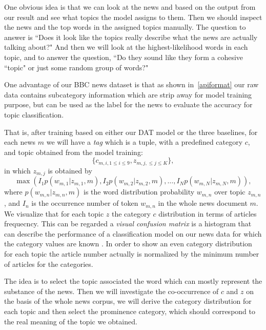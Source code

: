 One obvious idea is that we can look at the news and based on the output from our result and see what topics the model assigns to them. Then we should inspect the news and the top words in the assigned topics manually. The question to answer is ``Does it look like the topics really describe what the news are actually talking about?" And then we will look at the highest-likelihood words in each topic, and to answer the question, ``Do they sound like they form a cohesive ``topic" or just some random group of words?"

One advantage of our BBC news dataset is that as shown in~\ref{apiformat} our raw data contains subcategory information which are strip away for model training purpose, but can be used as the label for the news to evaluate the accuracy for topic classification. 

That is, after training based on either our DAT model or the three baselines, for each news $m$ we will have a \textit{tag} which is a tuple, with a predefined category $c$, and topic obtained from the model training:
\begin{equation}
\{c_{m, i, 1 \leq i \leq 9}, z_{m, j, \leq j \leq K}\}, 
\end{equation}
in which $z_{m,j}$ is obtained by 
\begin{equation}
\max ({I_1{p(w_{m,1}|z_{m,1},m)}},{I_2{p(w_{m,2}|z_{m,2},m)}}, \ldots , {I_N{p(w_{m,N}|z_{m,N},m)}}),
\end{equation}
where ${{p(w_{m,n}|z_{m,n},m)}}$ is the word distribution probability $w_{m,n}$ over topic $z_{m,n}$, and ${I_n}$ is the occurrence number of token $w_{m,n}$ in the whole news document $m$. We visualize that for each topic $z$ the category $c$ distribution in terms of articles frequecncy. This can be regarded a \textit{visual confusion matrix} is a histogram that can describe the performance of a classification model on our news data for which the category values are known \cite{townsend1971theoretical}. In order to show an even category distribution for each topic the article number actually is normalized by the minimum number of articles for the categories.


The idea is to select the topic associated the word which can mostly represent the substance of the news. Then we will investigate the co-occurrence of $c$ and $z$ on the basis of the whole news corpus, we will derive the category distribution for each topic and then select the prominence category, which should correspond to the real meaning of the topic we obtained.


